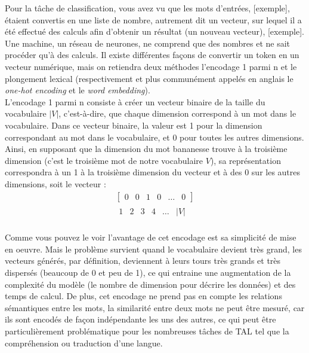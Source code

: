 \documentclass[12pt, french, twoside]{report}
\begin{document}
Pour la tâche de classification, vous avez vu que les mots d'entrées, [exemple], étaient convertis en une liste de nombre, autrement dit un vecteur, sur lequel il a été effectué des calculs afin d'obtenir un résultat (un nouveau vecteur), [exemple]. Une machine, un réseau de neurones, ne comprend que des nombres et ne sait procéder qu'à des calculs. Il existe différentes façons de convertir un token en un vecteur numérique, mais on retiendra deux méthodes l'encodage 1 parmi n et le plongement lexical (respectivement et plus communément appelés en anglais le \textit{one-hot encoding} et le \textit{word embedding}).\\

L'encodage 1 parmi n consiste à créer un vecteur binaire de la taille du vocabulaire $|V|$, c'est-à-dire, que chaque dimension correspond à un mot dans le vocabulaire. Dans ce vecteur binaire, la valeur est 1 pour la dimension correspondant au mot dans le vocabulaire, et 0 pour toutes les autres dimensions. Ainsi, en supposant que la dimension du mot \og bananes\fg se trouve à la troisième dimension (c'est le troisième mot de notre vocabulaire $V$), sa représentation correspondra à un 1 à la troisième dimension du vecteur et à des 0 sur les autres dimensions, soit le vecteur :
\begin{align*}
    \begin{bmatrix}
    0 & 0 & 1 & 0 & \dots & 0
    \end{bmatrix}\\
    \begin{matrix}
    1 & 2 & 3 & 4 & \dots & |V|
    \end{matrix}
\end{align*}
\hfill \cite[(Chap 7, Jurasky)]{jurafsky_ffnn}\\

Comme vous pouvez le voir l'avantage de cet encodage est sa simplicité de mise en oeuvre. Mais le problème survient quand le vocabulaire devient très grand, les vecteurs générés, par définition, deviennent à leurs tours très grands et très dispersés (beaucoup de 0 et peu de 1), ce qui entraine une augmentation de la complexité du modèle (le nombre de dimension pour décrire les données) et des temps de calcul. De plus, cet encodage ne prend pas en compte les relations sémantiques entre les mots, la similarité entre deux mots ne peut être mesuré,  car ils sont encodés de façon indépendante les uns des autres, ce qui peut être particulièrement problématique pour les nombreuses tâches de TAL tel que la compréhension ou traduction d'une langue.
\end{document}
